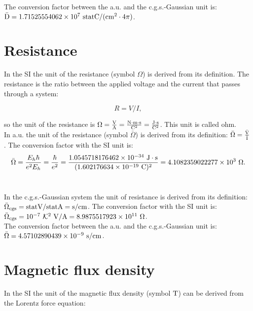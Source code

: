 \documentclass[12pt,a4paper,twoside]{report}
\def\hbarf{1.0545718176462\times 10^{-34}}
\def\barc{1.602176634\times 10^{-19}}
\def\barohm{4.1082359022277\times 10^{3}}
\def\ohmtoohm{8.9875517923\times 10^{11}}
\def\bardcgs{1.71525554062\times 10^{7}}
\def\barohmcgs{4.57102890439\times 10^{-9}}
\begin{document}
{{\color{green} 
The conversion factor between the a.u. and the c.g.s.-Gaussian unit is: 
${\rm \bar D} = \bardcgs \ {\rm statC}/({\rm cm}^2 \cdot 4 \pi)$.
}

\newpage
{\color{coral}\section{Resistance}}
\color{black}
In the SI the unit of the resistance (symbol $\Omega$)
is derived from its definition. The resistance is the ratio between 
the applied voltage and the current that passes through a system:

\begin{tcolorbox}
\begin{equation}
R=V/I,
\end{equation}
\end{tcolorbox}

so the unit of the resistance is $\Omega={{\rm V} \over {\rm A}}=
{{\rm N}\cdot {\rm m} \cdot {\rm s} \over {\rm C}^2}=
{{\rm J}\cdot {\rm s} \over {\rm C}^2}$. This
unit is called ohm.
\\

{\color{web-blue} In a.u. the unit of the resistance (symbol $\bar \Omega$) 
is derived from its definition: $\bar \Omega={{\rm \bar V} \over {\rm \bar I}}$. The
conversion factor with the SI unit is:
\begin{equation}
\bar \Omega = {E_h \hbar \over e^2 E_h}=  
{\hbar \over e^2}=
{\hbarf\ {\rm J}\cdot {\rm s}\over (\barc\ {\rm C})^2}=\barohm\ \Omega.
\end{equation}
\\
}

{\color{orange} In the c.g.s.-Gaussian system the unit of resistance
is derived from its definition:
${\rm \bar \Omega_{cgs}}={\rm statV}/{\rm statA}={\rm s}/{\rm cm}$. The conversion factor with the SI 
unit is:
${\rm \bar \Omega_{cgs}}=10^{-7}\ \mathcal{K}^2\ {\rm V}/{\rm A}=\ohmtoohm\ {\Omega}$.
}
\\

{\color{green}
The conversion factor between the a.u. and the c.g.s.-Gaussian unit
is: $\bar \Omega = \barohmcgs \ {\rm s}/{\rm cm}$.
}


\newpage
{\color{coral}\section{Magnetic flux density}}
\color{black}
In the SI the unit of the magnetic flux density 
(symbol ${\rm T}$) can be derived from the Lorentz force equation:

}
\end{document}
